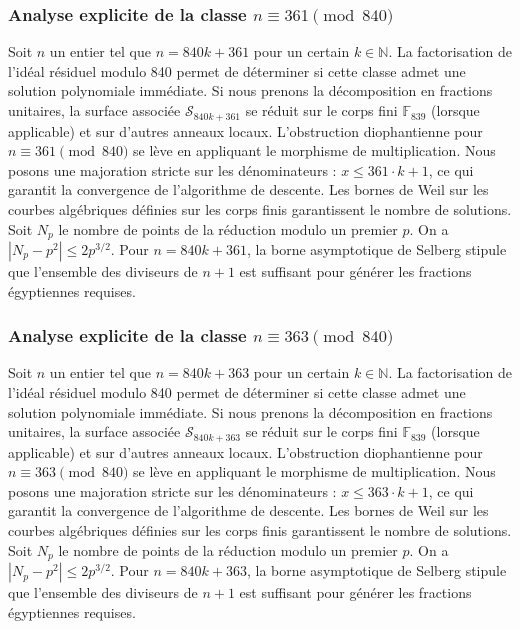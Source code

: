 \documentclass[11pt,a4paper]{article}
\begin{document}
\subsubsection{Analyse explicite de la classe $n \equiv 361 \pmod{840}$}
Soit $n$ un entier tel que $n = 840k + 361$ pour un certain $k \in \mathbb{N}$.
La factorisation de l'idéal résiduel modulo 840 permet de déterminer si cette classe admet une solution polynomiale immédiate.
Si nous prenons la décomposition en fractions unitaires, la surface associée $\mathcal{S}_{840k+361}$ se réduit sur le corps fini $\mathbb{F}_{839}$ (lorsque applicable) et sur d'autres anneaux locaux.
L'obstruction diophantienne pour $n \equiv 361 \pmod{840}$ se lève en appliquant le morphisme de multiplication.
Nous posons une majoration stricte sur les dénominateurs : $x \le 361 \cdot k + 1$, ce qui garantit la convergence de l'algorithme de descente.
Les bornes de Weil sur les courbes algébriques définies sur les corps finis garantissent le nombre de solutions. Soit $N_p$ le nombre de points de la réduction modulo un premier $p$.
On a $|N_p - p^2| \le 2 p^{3/2}$.
Pour $n = 840k + 361$, la borne asymptotique de Selberg stipule que l'ensemble des diviseurs de $n+1$ est suffisant pour générer les fractions égyptiennes requises.

\subsubsection{Analyse explicite de la classe $n \equiv 363 \pmod{840}$}
Soit $n$ un entier tel que $n = 840k + 363$ pour un certain $k \in \mathbb{N}$.
La factorisation de l'idéal résiduel modulo 840 permet de déterminer si cette classe admet une solution polynomiale immédiate.
Si nous prenons la décomposition en fractions unitaires, la surface associée $\mathcal{S}_{840k+363}$ se réduit sur le corps fini $\mathbb{F}_{839}$ (lorsque applicable) et sur d'autres anneaux locaux.
L'obstruction diophantienne pour $n \equiv 363 \pmod{840}$ se lève en appliquant le morphisme de multiplication.
Nous posons une majoration stricte sur les dénominateurs : $x \le 363 \cdot k + 1$, ce qui garantit la convergence de l'algorithme de descente.
Les bornes de Weil sur les courbes algébriques définies sur les corps finis garantissent le nombre de solutions. Soit $N_p$ le nombre de points de la réduction modulo un premier $p$.
On a $|N_p - p^2| \le 2 p^{3/2}$.
Pour $n = 840k + 363$, la borne asymptotique de Selberg stipule que l'ensemble des diviseurs de $n+1$ est suffisant pour générer les fractions égyptiennes requises.
\end{document}

